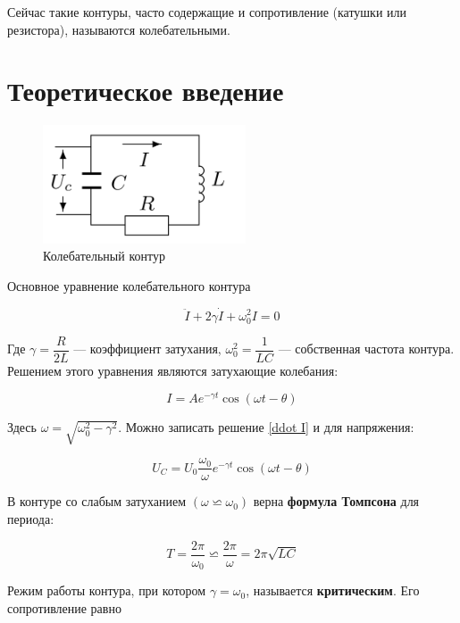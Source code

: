 \documentclass[12pt]{kiarticle} %
\begin{document}
Сейчас такие контуры, часто содержащие и сопротивление (катушки или резистора), называются колебательными.

\section{Теоретическое введение}

\begin{figure} 
	\includegraphics[width=6cm]{RLC}
	\caption{Колебательный контур}
	\label{RLC}
\end{figure}

Основное уравнение колебательного контура 

\begin{equation}\label{ddot I}
\ddot{I} + 2\gamma\dot{I} + \omega_0^2I = 0
\end{equation}

Где $ \gamma = \dfrac{R}{2L} $ --- коэффициент затухания, $ \omega_0^2 = \dfrac{1}{LC} $ --- собственная частота контура. Решением этого уравнения являются затухающие колебания:

\begin{equation}\label{}
I = A e^{-\gamma t} \cos (\omega t - \theta)
\end{equation}

Здесь $ \omega = \sqrt{\omega_0^2 - \gamma^2} $. Можно записать решение \eqref{ddot I} и для напряжения:

\begin{equation}\label{}
U_C = U_0 \dfrac{\omega_0}{\omega} e^{-\gamma t}\cos (\omega t - \theta)
\end{equation}

В контуре со слабым затуханием $ (\omega \backsimeq \omega_0) $ верна \textbf{формула Томпсона} для периода: 

\begin{equation}\label{}
T = \dfrac{2\pi}{\omega_0} \backsimeq  \dfrac{2\pi}{\omega} = 2\pi\sqrt{LC}
\end{equation}

Режим работы контура, при котором $ \gamma = \omega_0 $, называется \textbf{критическим}. Его сопротивление равно 
\end{document}
